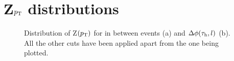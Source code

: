 \section{Z$p_\text{T}$ distributions}
\begin{figure}[H]
	\centering
	\hfill
	\hfill
	\caption{Distribution of Z$(p_\text{T})$ for in between events (a) and $\Delta\phi(\tau_\text{h},l)$ (b). All the other cuts have been applied apart from the one being plotted.}
	\label{Fig21}
\end{figure}
